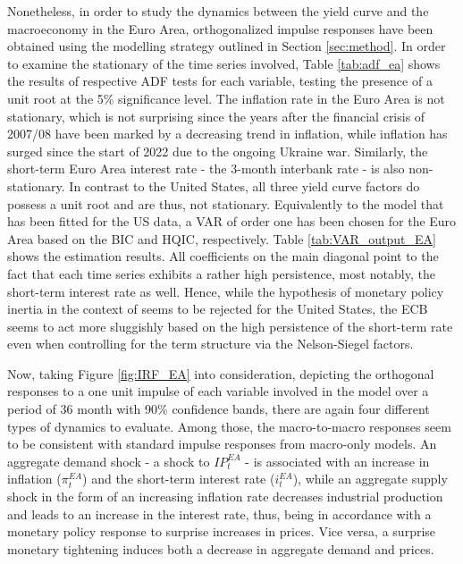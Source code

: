 Nonetheless, in order to study the dynamics between the yield curve and the macroeconomy in the Euro Area, orthogonalized impulse responses have been obtained using the modelling strategy outlined in Section \ref{sec:method}. 
In order to examine the stationary of the time series involved, Table \ref{tab:adf_ea} shows the results of respective ADF tests for each variable, testing the presence of a unit root at the 5\% significance level. 
The inflation rate in the Euro Area is not stationary, which is not surprising since the years after the financial crisis of 2007/08 have been marked by a decreasing trend in inflation, while inflation has surged since the start of 2022 due to the ongoing Ukraine war. 
Similarly, the short-term Euro Area interest rate - the 3-month interbank rate - is also non-stationary.
In contrast to the United States, all three yield curve factors do possess a unit root and are thus, not stationary. 
Equivalently to the model that has been fitted for the US data, a VAR of order one has been chosen for the Euro Area based on the BIC and HQIC, respectively. 
Table \ref{tab:VAR_output_EA} shows the estimation results. 
All coefficients on the main diagonal point to the fact that each time series exhibits a rather high persistence, most notably, the short-term interest rate as well. 
Hence, while the hypothesis of monetary policy inertia in the context of \citet{rudebusch2005monetary} seems to be rejected for the United States, the ECB seems to act more sluggishly based on the high persistence of the short-term rate even when controlling for the term structure via the Nelson-Siegel factors. 

Now, taking Figure \ref{fig:IRF_EA} into consideration, depicting the orthogonal responses to a one unit impulse of each variable involved in the model over a period of 36 month with 90\% confidence bands, there are again four different types of dynamics to evaluate. 
Among those, the macro-to-macro responses seem to be consistent with standard impulse responses from macro-only models. 
An aggregate demand shock - a shock to $IP^{EA}_{t}$ - is associated with an increase in inflation ($\pi^{EA}_{t}$) and the short-term interest rate ($i^{EA}_{t}$), while an aggregate supply shock in the form of an increasing inflation rate decreases industrial production and leads to an increase in the interest rate, thus, being in accordance with a monetary policy response to surprise increases in prices. 
Vice versa, a surprise monetary tightening induces both a decrease in aggregate demand and prices. 

